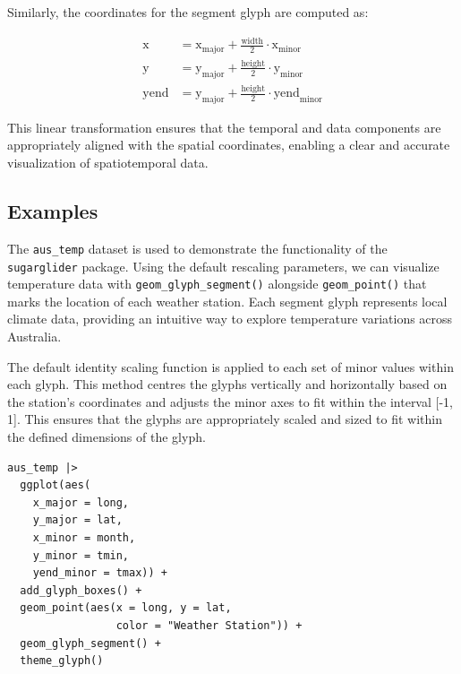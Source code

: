 Similarly, the coordinates for the segment glyph are computed as:

\begin{align}
\text{x} &= \text{x}_{\text{major}} + \frac{\text{width}}{2} \cdot \text{x}_{\text{minor}} \\
\text{y} &= \text{y}_{\text{major}} + \frac{\text{height}}{2} \cdot \text{y}_{\text{minor}} \\
\text{yend} &= \text{y}_{\text{major}} + \frac{\text{height}}{2} \cdot \text{yend}_{\text{minor}}
\end{align}

This linear transformation ensures that the temporal and data components are appropriately aligned with the spatial coordinates, enabling a clear and accurate visualization of spatiotemporal data.

\hypertarget{examples}{%
\subsection{Examples}\label{examples}}

The \texttt{aus\_temp} dataset is used to demonstrate the functionality of the \texttt{sugarglider} package. Using the default rescaling parameters, we can visualize temperature data with \texttt{geom\_glyph\_segment()} alongside \texttt{geom\_point()} that marks the location of each weather station. Each segment glyph represents local climate data, providing an intuitive way to explore temperature variations across Australia.

The default identity scaling function is applied to each set of minor values within each glyph. This method centres the glyphs vertically and horizontally based on the station's coordinates and adjusts the minor axes to fit within the interval {[}-1, 1{]}. This ensures that the glyphs are appropriately scaled and sized to fit within the defined dimensions of the glyph.

\begin{verbatim}
aus_temp |>
  ggplot(aes(
    x_major = long, 
    y_major = lat, 
    x_minor = month, 
    y_minor = tmin, 
    yend_minor = tmax)) +
  add_glyph_boxes() +
  geom_point(aes(x = long, y = lat,
                 color = "Weather Station")) +
  geom_glyph_segment() +
  theme_glyph()
\end{verbatim}

